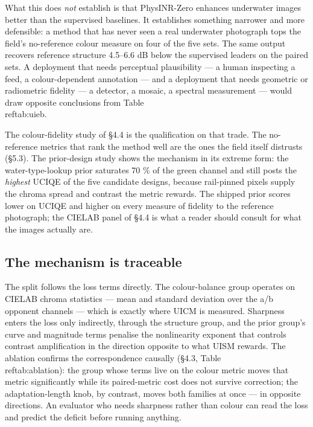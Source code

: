 \documentclass[journal]{IEEEtran}
\begin{document}
What this does \emph{not} establish is that PhysINR-Zero enhances underwater images better than the supervised baselines. It establishes something narrower and more defensible: a method that has never seen a real underwater photograph tops the field's no-reference colour measure on four of the five sets. The same output recovers reference structure 4.5--6.6 dB below the supervised leaders on the paired sets. A deployment that needs perceptual plausibility --- a human inspecting a feed, a colour-dependent annotation --- and a deployment that needs geometric or radiometric fidelity --- a detector, a mosaic, a spectral measurement --- would draw opposite conclusions from Table~\\ref{tab:uieb}.

The colour-fidelity study of \S{}4.4 is the qualification on that trade. The no-reference metrics that rank the method well are the ones the field itself distrusts (\S{}5.3). The prior-design study shows the mechanism in its extreme form: the water-type-lookup prior saturates 70 \% of the green channel and still posts the \emph{highest} UCIQE of the five candidate designs, because rail-pinned pixels supply the chroma spread and contrast the metric rewards. The shipped prior scores lower on UCIQE and higher on every measure of fidelity to the reference photograph; the CIELAB panel of \S{}4.4 is what a reader should consult for what the images actually are.

\subsection{The mechanism is traceable}
The split follows the loss terms directly. The colour-balance group operates on CIELAB chroma statistics --- mean and standard deviation over the a/b opponent channels --- which is exactly where UICM is measured. Sharpness enters the loss only indirectly, through the structure group, and the prior group's curve and magnitude terms penalise the nonlinearity exponent that controls contrast amplification in the direction opposite to what UISM rewards. The ablation confirms the correspondence causally (\S{}4.3, Table~\\ref{tab:ablation}): the group whose terms live on the colour metric moves that metric significantly while its paired-metric cost does not survive correction; the adaptation-length knob, by contrast, moves both families at once --- in opposite directions. An evaluator who needs sharpness rather than colour can read the loss and predict the deficit before running anything.
\end{document}
